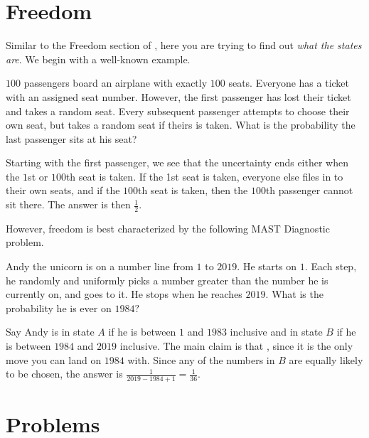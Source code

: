 \documentclass{article}
\begin{document}
\section{Freedom}

Similar to the Freedom section of , here you are trying to find out \textit{what the states are}. We begin with a well-known example.

\begin{exam}
$100$ passengers board an airplane with exactly $100$ seats. Everyone has a ticket with an assigned seat number. However, the first passenger has lost their ticket and takes a random seat. Every subsequent passenger attempts to choose their own seat, but takes a random seat if theirs is taken. What is the probability the last passenger sits at his seat?
\end{exam}

\begin{sol}
Starting with the first passenger, we see that the uncertainty ends either when the $1$st or $100$th seat is taken. If the 1st seat is taken, everyone else files in to their own seats, and if the $100$th seat is taken, then the $100$th passenger cannot sit there. The answer is then $\frac{1}{2}.$
\end{sol}

However, freedom is best characterized by the following MAST Diagnostic problem.

\begin{exam}
Andy the unicorn is on a number line from $1$ to $2019.$ He starts on $1.$ Each step, he randomly and uniformly picks a number greater than the number he is currently on, and goes to it. He stops when he reaches $2019.$ What is the probability he is ever on $1984?$
\end{exam}

\begin{sol}
Say Andy is in state $A$ if he is between $1$ and $1983$ inclusive and in state $B$ if he is between $1984$ and $2019$ inclusive. The main claim is that , since it is the only move you can land on $1984$ with. Since any of the numbers in $B$ are equally likely to be chosen, the answer is $\frac{1}{2019-1984+1}=\frac{1}{36}.$
\end{sol}

\pagebreak

\section{Problems}
\end{document}
